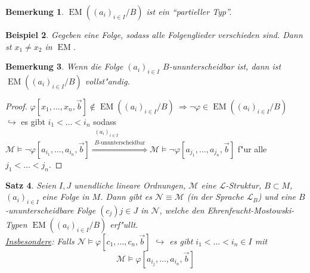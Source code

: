 \documentclass[a4paper,12pt,numbers=noenddot,parskip=full]{scrartcl}
\newcommand{\scrL}{\mathcal{L}}
\newcommand{\scrM}{\mathcal{M}}
\newcommand{\scrN}{\mathcal{N}}
\DeclareMathOperator{\EM}{EM}
\theoremstyle{dotless}
\newtheorem{theorem}{Satz}[section]
\newtheorem{example}[theorem]{Beispiel}
\newtheorem{remark}[theorem]{Bemerkung}
\begin{document}
\begin{remark}
	$\EM \left((a_i)_{i \in I}/B\right)$ ist ein "`partieller Typ"'.
\end{remark}
\begin{example}
	Gegeben eine Folge, sodass alle Folgenglieder verschieden sind. Dann st $x_1 \neq x_2$ in $\EM$.
\end{example}
\begin{remark}
	Wenn die Folge $(a_i)_{i \in I}$ $B$-ununterscheidbar ist, dann ist $\EM((a_i)_{i \in I}/B)$ vollst"andig.
\end{remark}
\begin{proof}
	$\varphi[x_1, \dots, x_n, \vec{b}] \not\in \EM((a_i)_{i \in I}/B)~ \Rightarrow \lnot \varphi \in \EM((a_i)_{i \in I}/B)$\\
	$\hookrightarrow$ es gibt $i_1<\dots<i_n$ sodass $\scrM \models \lnot \varphi\left[a_{i_1},\dots, a_{i_n}, \vec{b}\right] \overset{\substack{(a_i)_{i \in I}\\B\text{-ununterscheidbar}}}{\Longrightarrow} \scrM \models \lnot \varphi\left[a_{j_1}, \dots, a_{j_n},\vec{b}\right]$ f"ur alle $j_1 < \dots < j_n$.
\end{proof}
\begin{theorem}
	Seien $I,J$ unendliche lineare Ordnungen, $\scrM$ eine $\scrL$-Struktur, $B \subset M$, $(a_i)_{i \in I}$ eine Folge in $M$. Dann gibt es $\scrN \equiv \scrM$ (in der Sprache $\scrL_B$) und eine $B$-ununterscheidbare Folge $(c_j){j \in J}$ in $\scrN$, welche den Ehrenfeucht-Mostowski-Typen $\EM \left((a_i)_{i \in I}/B\right)$ erf"ullt.\\
	\underline{Insbesondere}: Falls $\scrN \models \varphi\left[c_1, \dots, c_n, \vec{b}\right]$ $\hookrightarrow$ es gibt $i_1<\dots<i_n \in I$ mit \begin{equation*}
		\scrM \models \varphi\left[a_{i_j},\dots, a_{i_n}, \vec{b}\right]
	\end{equation*}
\end{theorem}
\end{document}
